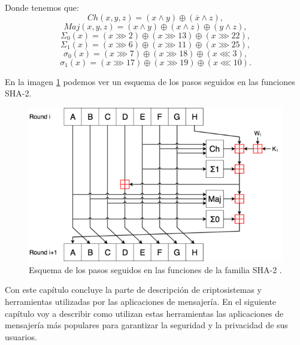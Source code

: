 Donde tenemos que:
$$
	Ch(x,y,z) = (x\wedge y)\oplus (\overline{x}\wedge z),
$$
$$
	Maj(x,y,z) = (x\wedge y)\oplus (x\wedge z)\oplus (y\wedge z),
$$
$$
	\Sigma_0(x) = (x\ggg2)\oplus (x\ggg13)\oplus (x\ggg22),
$$
$$
	\Sigma_1(x) = (x\ggg6)\oplus (x\ggg11)\oplus (x\ggg25),
$$
$$
	\sigma_0(x) = (x\ggg7)\oplus (x\ggg18)\oplus (x\lll3),
$$
$$
	\sigma_1(x) = (x\ggg17)\oplus (x\ggg19)\oplus (x\lll10).
$$

En la imagen \ref{sha256img} podemos ver un esquema de los pasos seguidos en las funciones SHA-2.\\
\begin{figure}[htb]
	\centering
	\includegraphics[scale=0.5]{imagenes/sha2.png} 
	\caption{Esquema de los pasos seguidos en las funciones de la familia SHA-2 \cite{sha2wikipedia}.}
	\label{sha256img}
\end{figure}
\newpage
Con este capítulo concluye la parte de descripción de criptosistemas y herramientas utilizadas por las aplicaciones de mensajería. En el siguiente capítulo voy a describir como utilizan estas herramientas las aplicaciones de mensajería más populares para garantizar la seguridad y la privacidad de sus usuarios.
